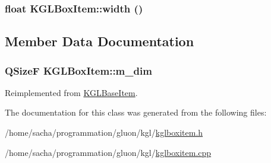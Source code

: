 \hypertarget{class_k_g_l_box_item_ca8cc8587d49d4b85a1a3b6b0a1c9181}{
\subsubsection[{width}]{\setlength{\rightskip}{0pt plus 5cm}float KGLBoxItem::width ()}}
\label{class_k_g_l_box_item_ca8cc8587d49d4b85a1a3b6b0a1c9181}




\subsection{Member Data Documentation}
\hypertarget{class_k_g_l_box_item_1511f877831d9658a7ddbc543de61a53}{
\subsubsection[{m\_\-dim}]{\setlength{\rightskip}{0pt plus 5cm}QSizeF {\bf KGLBoxItem::m\_\-dim}}}
\label{class_k_g_l_box_item_1511f877831d9658a7ddbc543de61a53}




Reimplemented from \hyperlink{class_k_g_l_base_item}{KGLBaseItem}.

The documentation for this class was generated from the following files:\begin{CompactItemize}
\item 
/home/sacha/programmation/gluon/kgl/\hyperlink{kglboxitem_8h}{kglboxitem.h}\item 
/home/sacha/programmation/gluon/kgl/\hyperlink{kglboxitem_8cpp}{kglboxitem.cpp}\end{CompactItemize}
